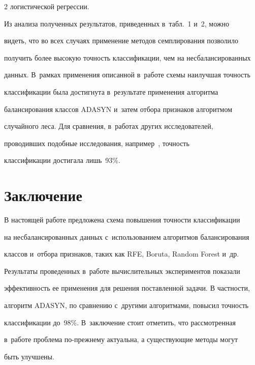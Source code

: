 \begin{multicols}{2}
логистической регрессии.

  

 

  

  Из анализа полученных результатов, приведенных в~табл.~1 и~2, можно 

видеть, что во всех случа\-ях применение методов семплирования позволило\linebreak 

получить более высокую точность классификации, чем на несбалансированных 

данных. В~рамках применения описанной в~работе схемы наилучшая точность 

классификации была достигнута в~результате применения алгоритма 

балансирования классов ADASYN и~затем отбора признаков алгоритмом 

случайного леса. Для сравнения, в~работах других исследователей, 

проводивших подобные исследования, например~\cite{9-sev, 10-sev}, точность 

классификации достигала лишь~93\%.

  

\section{Заключение}



  В настоящей работе предложена схема повышения точности классификации 

на несбалансированных данных с~использованием алгоритмов балансирования 

классов и~отбора признаков, таких как RFE, Boruta, Random Forest и~др. 

Результаты проведенных в~работе вычислительных экспериментов показали 

эффективность ее применения для решения поставленной задачи. В частности, 

алгоритм ADASYN, по сравнению с~другими алгоритмами, повысил точность 

классификации до~98\%. В~заключение стоит отметить, что рассмотренная 

в~работе проблема по-прежнему актуальна, а существующие методы могут 

быть улучшены.

  

{\small\frenchspacing

 {%

}}
\end{multicols}
